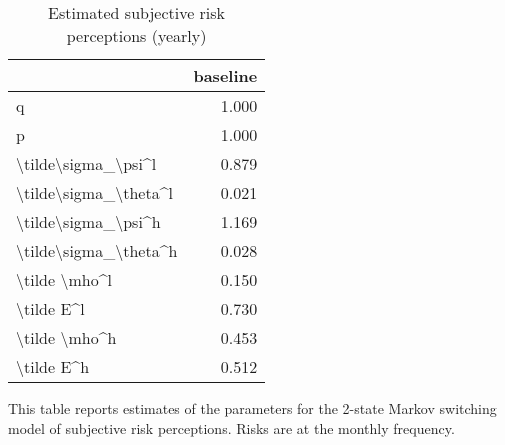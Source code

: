 
\begin{table}[p]
\centering
\begin{adjustbox}{width=0.3\textwidth}
\begin{threeparttable}
\caption{Estimated subjective risk perceptions (yearly)}
\label{tab:PRMarkovEst}\begin{tabular}{lr}
\toprule
{} &  baseline \\
\midrule
q                     &     1.000 \\
p                     &     1.000 \\
\textbackslash tilde\textbackslash sigma\_\textbackslash psi\textasciicircum l   &     0.879 \\
\textbackslash tilde\textbackslash sigma\_\textbackslash theta\textasciicircum l &     0.021 \\
\textbackslash tilde\textbackslash sigma\_\textbackslash psi\textasciicircum h   &     1.169 \\
\textbackslash tilde\textbackslash sigma\_\textbackslash theta\textasciicircum h &     0.028 \\
\textbackslash tilde \textbackslash mho\textasciicircum l         &     0.150 \\
\textbackslash tilde E\textasciicircum l            &     0.730 \\
\textbackslash tilde \textbackslash mho\textasciicircum h         &     0.453 \\
\textbackslash tilde E\textasciicircum h            &     0.512 \\
\bottomrule
\end{tabular}
\begin{tablenotes}\item This table reports estimates of the parameters 
for the 2-state Markov switching model of subjective risk perceptions. Risks are at the monthly frequency. 
\end{tablenotes}
\end{threeparttable}
\end{adjustbox}
\end{table}